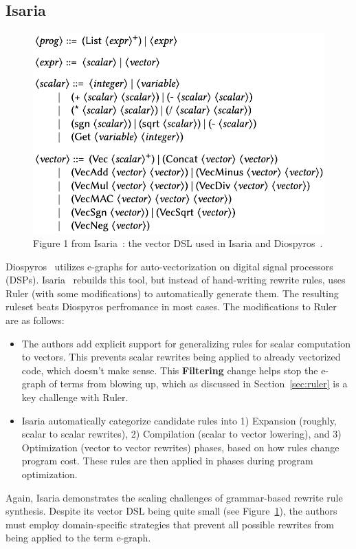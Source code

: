 \documentclass[acmsmall,screen,nonacm]{acmart}
\begin{document}
\subsection{Isaria}
\begin{figure}[htbp]
\centering
\includegraphics[scale=0.5,trim=0cm 0cm 0cm 0cm, clip]{figs/isaria_dsl.png}
\caption{Figure 1 from Isaria~\cite{thomas2024isaria}: the vector DSL used in Isaria and Diospyros~\cite{vanhattum2021diospyros}.}
\label{fig:isaria_dsl}
\end{figure}

Diospyros~\cite{vanhattum2021diospyros} utilizes e-graphs for auto-vectorization on digital signal processors (DSPs). Isaria~\cite{thomas2024isaria} rebuilds this tool, but instead of hand-writing rewrite rules, uses Ruler (with some modifications) to automatically generate them. The resulting ruleset beats Diospyros perfromance in most cases. The modifications to Ruler are as follows:
\begin{itemize}
    \item The authors add explicit support for generalizing rules for scalar computation to vectors. This prevents scalar rewrites being applied to already vectorized code, which doesn't make sense. This \textbf{Filtering} change helps stop the e-graph of terms from blowing up, which as discussed in Section~\ref{sec:ruler} is a key challenge with Ruler.
    \item Isaria automatically categorize candidate rules into 1) Expansion (roughly, scalar to scalar rewrites), 2) Compilation (scalar to vector lowering), and 3) Optimization (vector to vector rewrites) phases, based on how rules change program cost. These rules are then applied in phases during program optimization.
\end{itemize}
Again, Isaria demonstrates the scaling challenges of grammar-based rewrite rule synthesis. Despite its vector DSL being quite small (see Figure~\ref{fig:isaria_dsl}), the authors must employ domain-specific strategies that prevent all possible rewrites from being applied to the term e-graph.
\end{document}
